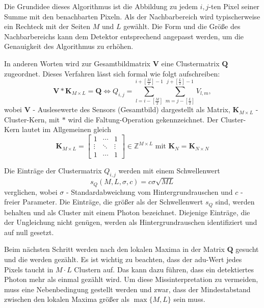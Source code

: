 \noindent
Die Grundidee dieses Algorithmus ist die Abbildung zu jedem $i,j$-ten Pixel seiner Summe mit den benachbarten Pixeln. Als der Nachbarbereich wird typischerweise ein Rechteck mit der Seiten $M$ und $L$ gewählt. Die Form und die Größe des Nachbarbereichs kann dem Detektor entsprechend angepasst werden, um die Genauigkeit des Algorithmus zu erhöhen.

\noindent
In anderen Worten wird zur Gesamtbildmatrix $\mathbf{V}$ eine Clustermatrix $\mathbf{Q}$ zugeordnet. Dieses Verfahren lässt sich formal wie folgt aufschreiben:
\begin{equation}
     \mathbf{V} * \mathbf{K}_{M\times L} =  \mathbf{Q} \Leftrightarrow Q_{i, j} = \sum_{l=i-\left[\frac{M}{2}\right]}^{i+\left[\frac{M}{2}\right]-1} \sum_{m=j-\left[\frac{L}{2}\right]}^{j+\left[\frac{L}{2}\right]-1} V_{l,m},
\end{equation}
wobei $\mathbf{V}$ - Auslesewerte des Sensors (Gesamtbild) dargestellt als Matrix, $\mathbf{K}_{M \times L}$ - Cluster-Kern, mit $*$ wird die Faltung-Operation gekennzeichnet. Der Cluster-Kern lautet im Allgemeinen gleich
\begin{equation}
    \mathbf{K}_{M \times L}  = \begin{bmatrix}
1 & \cdots & 1\\
\vdots & \ddots & \vdots\\
1 & \cdots & 1
\end{bmatrix}
\in \mathbb{Z}^{M \times L} \text{ mit } \mathbf{K}_N = \mathbf{K}_{N \times N}
\end{equation}

\noindent
Die Einträge der Clustermatrix $Q_{i,j}$ werden mit einem Schwellenwert 
\begin{equation}
    s_Q(M, L, \sigma, c) = c\sigma\sqrt{ML}
\end{equation}
verglichen, wobei $\sigma$ - Standardabweichung vom Hintergrundrauschen und $c$ - freier Parameter. Die Einträge, die größer als der Schwellenwert $s_Q$ sind, werden behalten und als Cluster mit einem Photon bezeichnet. Diejenige Einträge, die der Ungleichung nicht genügen, werden als Hintergrundrauschen identifiziert und auf null gesetzt.

\noindent
Beim nächsten Schritt werden nach den lokalen Maxima in der Matrix $\mathbf{Q}$ gesucht und die werden gezählt. Es ist wichtig zu beachten, dass der \gls{adu}-Wert jedes Pixels taucht in $M\cdot L$ Clustern auf. Das kann dazu führen, dass ein detektiertes Photon mehr als einmal gezählt wird. Um diese Missinterpretation zu vermeiden, muss eine Nebenbedingung gestellt werden und zwar, dass der Mindestabstand zwischen den lokalen Maxima größer als $\max\{M,L\}$ sein muss.

